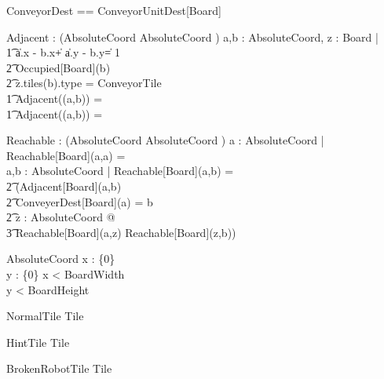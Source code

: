 \documentclass[12pt]{article}
\begin{document}
\begin{gendef}[Board]
ConveyorDest == ConveyorUnitDest[Board] \star
\end{gendef}

\begin{gendef}[Board]
Adjacent : \power (AbsoluteCoord \times AbsoluteCoord \pfun \bool)
\where
\forall a,b : AbsoluteCoord, z : Board |\\ \t1
\IF \|a.x - b.x\| + \|a.y - b.y\| = 1 \\ \t2
\neg Occupied[Board](b) \\ \t2
z.tiles(b).type \not = ConveyorTile \\ \t1
\THEN Adjacent((a,b)) = \true \\ \t1
\ELSE Adjacent((a,b)) = \false
\end{gendef}

\begin{gendef}[Board]
Reachable : \power (AbsoluteCoord \times AbsoluteCoord \pfun \bool)
\where
\forall a : AbsoluteCoord | Reachable[Board](a,a) = \true \\
\forall a,b : AbsoluteCoord | Reachable[Board](a,b) = \\ \t2 (Adjacent[Board](a,b) \: \vee \\ \t2 ConveyerDest[Board](a) = b \: \vee \\ \t2
\exists z : AbsoluteCoord @ \\ \t3 Reachable[Board](a,z) \wedge Reachable[Board](z,b))
\end{gendef}

\begin{schema}{AbsoluteCoord}
x : \nat \cup \{0\} \\
y : \nat \cup \{0\}
\where
x < BoardWidth \\
y < BoardHeight
\end{schema}


\begin{schema}{NormalTile}
Tile
\end{schema}

\begin{schema}{HintTile}
Tile
\end{schema}

\begin{schema}{BrokenRobotTile}
Tile
\end{schema}
\end{document}
